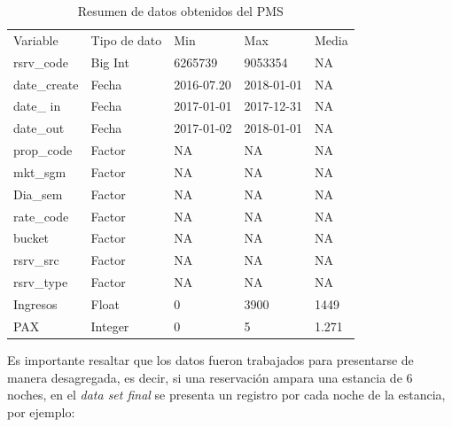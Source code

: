 \begin{table}[H]
\begin{tabular}{lllll}
Variable     & Tipo de dato & Min        & Max        & Media \\
rsrv\_code   & Big Int      & 6265739    & 9053354    & NA    \\
date\_create & Fecha        & 2016-07.20 & 2018-01-01 & NA    \\
date\_ in    & Fecha        & 2017-01-01 & 2017-12-31 & NA    \\
date\_out    & Fecha        & 2017-01-02 & 2018-01-01 & NA    \\
prop\_code   & Factor       & NA         & NA         & NA    \\
mkt\_sgm     & Factor       & NA         & NA         & NA    \\
Dia\_sem     & Factor       & NA         & NA         & NA    \\
rate\_code   & Factor       & NA         & NA         & NA    \\
bucket       & Factor       & NA         & NA         & NA    \\
rsrv\_src    & Factor       & NA         & NA         & NA    \\
rsrv\_type   & Factor       & NA         & NA         & NA    \\
Ingresos     & Float        & 0          & 3900       & 1449  \\
PAX          & Integer      & 0          & 5          & 1.271 \\
\end{tabular}
\caption{Resumen de datos obtenidos del PMS} 
\end{table}

Es importante resaltar que los datos fueron trabajados para presentarse de manera desagregada, es decir, si una reservación ampara una estancia de 6 noches, en el \emph{data set final} se presenta un registro por cada noche de la estancia, por ejemplo:

